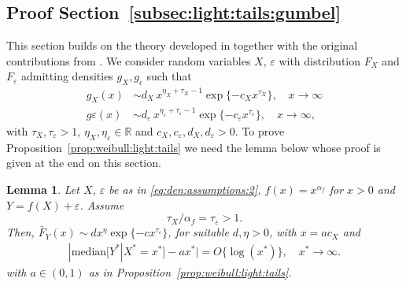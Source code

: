 \documentclass{statsoc}
\newtheorem{lemma}{Lemma}
\theoremstyle{break}
\newcommand{\eps}{\varepsilon}
\def\M{\text{median}}
\begin{document}
\subsection{Proof Section~\ref{subsec:light:tails:gumbel}}\label{sec:model:3}

This section builds on the theory developed in \cite{asmussen:hashorva:laub:taimre:2017} together with the original contributions 
from \cite{bal1993}.
We consider random variables $X$, $\varepsilon$ with distribution $F_X$ and $F_\varepsilon$ admitting densities $g_X,g_\epsilon$ such that
\begin{align}\label{eq:den:assumptions}
	g_X(x) &\sim d_X \, x^{\eta_X + \tau_X - 1} \exp\{ - c_X x^{\tau_X}\}, \quad x \to \infty \nonumber \\
	g\varepsilon(x) &\sim d_\varepsilon \, x^{\eta_\varepsilon + \tau_\eps  - 1} \exp\{ - c_\varepsilon  x^{\tau_\eps  }\},  \quad x \to \infty,
\end{align}
with $\tau_X, \tau_\eps > 1$, $\eta_X, \eta_\varepsilon \in\mathbb R$ and $c_X, c_\varepsilon, d_X, d_\varepsilon > 0$. 
To prove Proposition~\ref{prop:weibull:light:tails} we need the lemma below whose proof is given at the end on this section.

\begin{lemma}\label{lem:weibull:light:tails:2}
Let $X$, $\varepsilon$ be as in \eqref{eq:den:assumptions:2},
$f(x) = x^{\alpha_f}$ for $x > 0$ and $Y = f(X) + \varepsilon$. Assume 
\[
\tau_X/\alpha_f = \tau_\eps > 1.  
\]
Then, $\bar F_Y(x) \sim d x^\eta \exp\{ - c x^{\tau_\eps}\}$,  for suitable $d, \eta >0$, with $x= ac_X$ and 
\begin{align}\label{eq:median:result}
		|\M[Y^* | X^* = x^*]  	- a x^*| = O\{ \log(x^*)\}, \quad x^* \to\infty.
	\end{align} 
	with $a\in (0,1)$ as in Proposition~\ref{prop:weibull:light:tails}.
\end{lemma}
\end{document}
